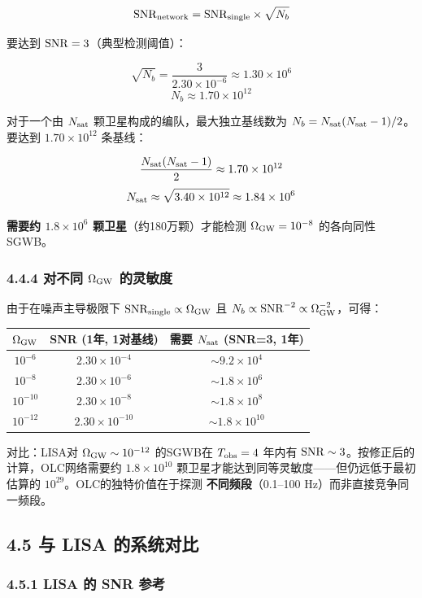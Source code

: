 \documentclass[12pt,a4paper]{article}
\begin{document}
$${\rm SNR}_{\rm network} = {\rm SNR}_{\rm single} \times \sqrt{N_b}$$

要达到 ${\rm SNR} = 3$（典型检测阈值）：

$$\sqrt{N_b} = \frac{3}{2.30 \times 10^{-6}} \approx 1.30 \times 10^6$$
$$N_b \approx 1.70 \times 10^{12}$$

对于一个由 $N_{\rm sat}$ 颗卫星构成的编队，最大独立基线数为 $N_b = N_{\rm sat}(N_{\rm sat}-1)/2$。要达到 $1.70 \times 10^{12}$ 条基线：

$$\frac{N_{\rm sat}(N_{\rm sat}-1)}{2} \approx 1.70 \times 10^{12}$$
$$N_{\rm sat} \approx \sqrt{3.40 \times 10^{12}} \approx 1.84 \times 10^6$$

\textbf{需要约 $1.8 \times 10^6$ 颗卫星}（约180万颗）才能检测 $\Omega_{\rm GW} = 10^{-8}$ 的各向同性SGWB。

\subsubsection{4.4.4 对不同 $\Omega_{\rm GW}$ 的灵敏度}

由于在噪声主导极限下 ${\rm SNR}_{\rm single} \propto \Omega_{\rm GW}$ 且 $N_b \propto {\rm SNR}^{-2} \propto \Omega_{\rm GW}^{-2}$，可得：

\begin{tabular}{|c|c|c|}
\hline
$\Omega_{\rm GW}$ & SNR (1年, 1对基线) & 需要 $N_{\rm sat}$ (SNR=3, 1年) \\
\hline
$10^{-6}$ & $2.30 \times 10^{-4}$ & $\sim 9.2 \times 10^{4}$ \\
$10^{-8}$ & $2.30 \times 10^{-6}$ & $\sim 1.8 \times 10^{6}$ \\
$10^{-10}$ & $2.30 \times 10^{-8}$ & $\sim 1.8 \times 10^{8}$ \\
$10^{-12}$ & $2.30 \times 10^{-10}$ & $\sim 1.8 \times 10^{10}$ \\
\hline
\end{tabular}

对比：LISA对 $\Omega_{\rm GW} \sim 10^{-12}$ 的SGWB在 $T_{\rm obs} = 4$ 年内有 ${\rm SNR} \sim 3$。按修正后的计算，OLC网络需要约 $1.8\times 10^{10}$ 颗卫星才能达到同等灵敏度——但仍远低于最初估算的 $10^{29}$。OLC的独特价值在于探测 \textbf{不同频段}（0.1–100 Hz）而非直接竞争同一频段。

\subsection{4.5 与 LISA 的系统对比}


\subsubsection{4.5.1 LISA 的 SNR 参考}
\end{document}
